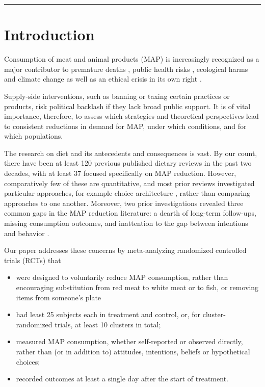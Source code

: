 \documentclass[sn-nature,pdflatex]{sn-jnl}
\begin{document}
\maketitle

\begin{center}\rule{0.5\linewidth}{0.5pt}\end{center}

\section{Introduction}\label{sec1}

Consumption of meat and animal products (MAP) is increasingly recognized
as a major contributor to premature deaths
\citep{willett2019, landry2023}, public health risks
\citep{slingenbergh2004, graham2008}, ecological harms
\citep{greger2010} and climate change
\citep{scarborough2023, koneswaran2008} as well as an ethical crisis in
its own right \citep{kuruc2023, singer2023}.

Supply-side interventions, such as banning or taxing certain practices
or products, risk political backlash if they lack broad public support.
It is of vital importance, therefore, to assess which strategies and
theoretical perspectives lead to consistent reductions in demand for
MAP, under which conditions, and for which populations.

The research on diet and its antecedents and consequences is vast. By
our count, there have been at least 120 previous published dietary
reviews in the past two decades, with at least 37 focused specifically
on MAP reduction. However, comparatively few of these are quantitative,
and most prior reviews investigated particular approaches, for example
choice architecture \citep{bianchi2018restructuring}, rather than
comparing approaches to one another. Moreover, two prior investigations
revealed three common gaps in the MAP reduction literature: a dearth of
long-term follow-ups, missing consumption outcomes, and inattention to
the gap between intentions and behavior
\citep{mathur2021meta, mathur2021effectiveness}.

Our paper addresses these concerns by meta-analyzing randomized
controlled trials (RCTs) that

\begin{itemize}
\item
  were designed to voluntarily reduce MAP consumption, rather than
  encouraging substitution from red meat to white meat or to fish, or
  removing items from someone's plate
\item
  had least 25 subjects each in treatment and control, or, for
  cluster-randomized trials, at least 10 clusters in total;
\item
  measured MAP consumption, whether self-reported or observed directly,
  rather than (or in addition to) attitudes, intentions, beliefs or
  hypothetical choices;
\item
  recorded outcomes at least a single day after the start of treatment.
\end{itemize}
\end{document}
